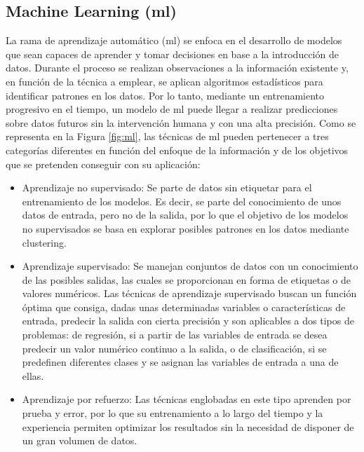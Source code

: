 \subsection{Machine Learning (\acrshort{ml})}
\label{sec:ml}

La rama de aprendizaje automático (\acrfull{ml}) se enfoca en el desarrollo de modelos que sean capaces de aprender y tomar decisiones en base a la introducción de datos. Durante el proceso se realizan observaciones a la información existente y, en función de la técnica a emplear, se aplican algoritmos estadísticos para identificar patrones en los datos. Por lo tanto, mediante un entrenamiento progresivo en el tiempo, un modelo de \gls{ml} puede llegar a realizar predicciones sobre datos futuros sin la intervención humana y con una alta precisión. Como se representa en la Figura \ref{fig:ml}, las técnicas de \gls{ml} pueden pertenecer a tres categorías diferentes en función del enfoque de la información y de los objetivos que se pretenden conseguir con su aplicación: \cite{mlcat} \cite{iageeks} \cite{mltlf}

\begin{itemize}
    \item Aprendizaje no supervisado: Se parte de datos sin etiquetar para el entrenamiento de los modelos. Es decir, se parte del conocimiento de unos datos de entrada, pero no de la salida, por lo que el objetivo de los modelos no supervisados se basa en explorar posibles patrones en los datos mediante clustering.
    \item Aprendizaje supervisado: Se manejan conjuntos de datos con un conocimiento de las posibles salidas, las cuales se proporcionan en forma de etiquetas o de valores numéricos. Las técnicas de aprendizaje supervisado buscan un función óptima que consiga, dadas unas determinadas variables o características de entrada, predecir la salida con cierta precisión y son aplicables a dos tipos de problemas: de regresión, si a partir de las variables de entrada se desea predecir un valor numérico continuo a la salida, o de clasificación, si se predefinen diferentes clases y se asignan las variables de entrada a una de ellas. 
    \item Aprendizaje por refuerzo: Las técnicas englobadas en este tipo aprenden por prueba y error, por lo que su entrenamiento a lo largo del tiempo y la experiencia permiten optimizar los resultados sin la necesidad de disponer de un gran volumen de datos.
\end{itemize}

